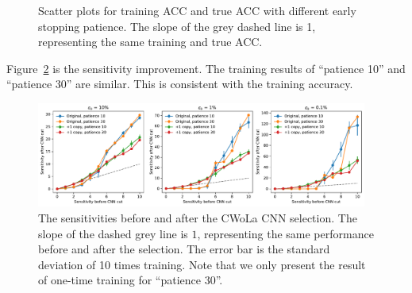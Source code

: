 \documentclass[12pt]{article}
\begin{document}
			\begin{figure}[htpb]
				\centering
				\caption{Scatter plots for training ACC and true ACC with different early stopping patience. The slope of the grey dashed line is 1, representing the same training and true ACC.}
				\label{fig:acc_scatter_patience_30}
			\end{figure}

			Figure~\ref{fig:sensitivity_improvement_bkg_eff_patience_30} is the sensitivity improvement. The training results of ``patience 10'' and ``patience 30'' are similar. This is consistent with the training accuracy. 
			\begin{figure}[htpb]
				\centering
				\includegraphics[width=0.97\textwidth]{HVmodel_sensitivity_improvement_bkg_eff_origin_copy_1_patience_30.pdf}
				\caption{The sensitivities before and after the CWoLa CNN selection. The slope of the dashed grey line is $1$, representing the same performance before and after the selection. The error bar is the standard deviation of 10 times training. Note that we only present the result of one-time training for ``patience 30''.}
				\label{fig:sensitivity_improvement_bkg_eff_patience_30}
			\end{figure}
\end{document}

